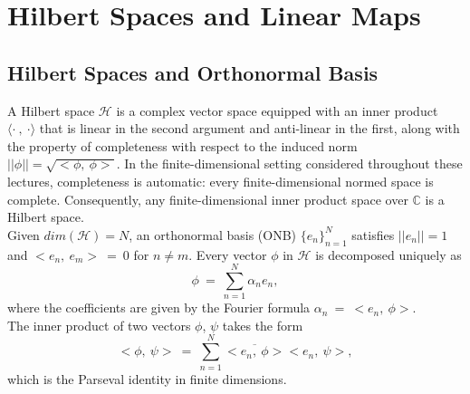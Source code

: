 \documentclass[11pt,a4paper]{article}
\begin{document}

\pagebreak
\clearpage
\null
\clearpage
\section{Hilbert Spaces and Linear Maps}
\label{sec:hilbert spaces and linear maps}
\subsection{Hilbert Spaces and Orthonormal Basis}
A Hilbert space $\mathcal{H}$ is a complex vector space equipped with an inner product $\langle \cdot \ ,\ \cdot \rangle$ that is linear in the second argument and anti-linear in the first, along with the property of completeness with respect to the induced norm $||\phi|| = \sqrt{<\phi,\ \phi>}$. In the finite-dimensional setting considered throughout these lectures, completeness is automatic: every finite-dimensional normed space is complete. Consequently, any finite-dimensional inner product space over $\mathbb{C}$ is a Hilbert space. \\

Given $dim(\mathcal{H}) = N$, an orthonormal basis (ONB) $\{e_n\}_{n=1}^N$ satisfies $||e_n|| = 1$ and $<e_n,\ e_m>\ =\ 0$ for $n \neq m$. Every vector $\phi$ in $\mathcal{H}$ is decomposed uniquely as $$\phi \ =\  \sum_{n=1}^{N}\alpha_n e_n,$$ where the coefficients are given by the Fourier formula $\alpha_n\ =\ <e_n,\ \phi>$. \\ The inner product of two vectors $\phi$, $\psi$ takes the form $$<\phi,\ \psi>\ =\ \sum_{n=1}^{N} \overline{<e_n,\ \phi>} <e_n,\ \psi>,$$ which is the Parseval identity in finite dimensions. \\
\end{document}
